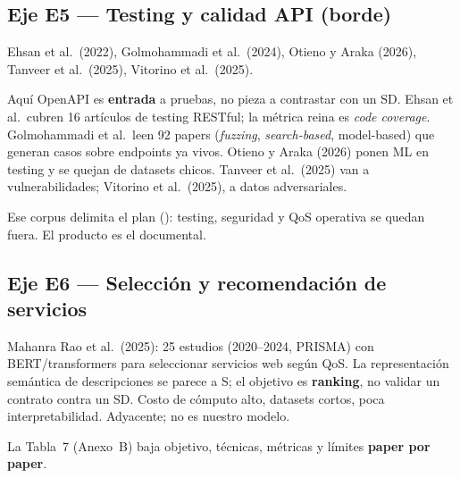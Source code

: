 \subsection{Eje E5 --- Testing y calidad API (borde)}

Ehsan et al.\ (2022), Golmohammadi et al.\ (2024), Otieno y Araka (2026), Tanveer et al.\ (2025),
Vitorino et al.\ (2025).

Aquí OpenAPI es \textbf{entrada} a pruebas, no pieza a contrastar con un SD. Ehsan et al.\ cubren
16 artículos de testing RESTful; la métrica reina es \textit{code coverage}. Golmohammadi et al.\
leen 92 papers (\textit{fuzzing}, \textit{search-based}, model-based) que generan casos sobre
endpoints ya vivos. Otieno y Araka (2026) ponen ML en testing y se quejan de datasets chicos.
Tanveer et al.\ (2025) van a vulnerabilidades; Vitorino et al.\ (2025), a datos adversariales.

Ese corpus delimita el plan (): testing, seguridad y QoS operativa se quedan
fuera. El producto es el \AlignmentScore{} documental.

\subsection{Eje E6 --- Selección y recomendación de servicios}

Mahanra Rao et al.\ (2025): 25 estudios (2020--2024, PRISMA) con BERT/transformers para seleccionar
servicios web según QoS. La representación semántica de descripciones se parece a S; el objetivo es
\textbf{ranking}, no validar un contrato contra un SD. Costo de cómputo alto, datasets cortos,
poca interpretabilidad. Adyacente; no es nuestro modelo.



La Tabla~7 (Anexo~B) baja objetivo, técnicas, métricas y límites \textbf{paper por paper}.
